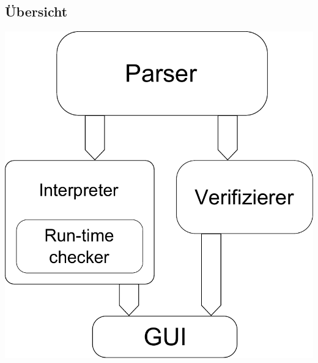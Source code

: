 \documentclass[a4paper,10pt]{article}
\begin{document}
\subsection{Übersicht}
\includegraphics{systemmodelle.pdf}
\end{document}
